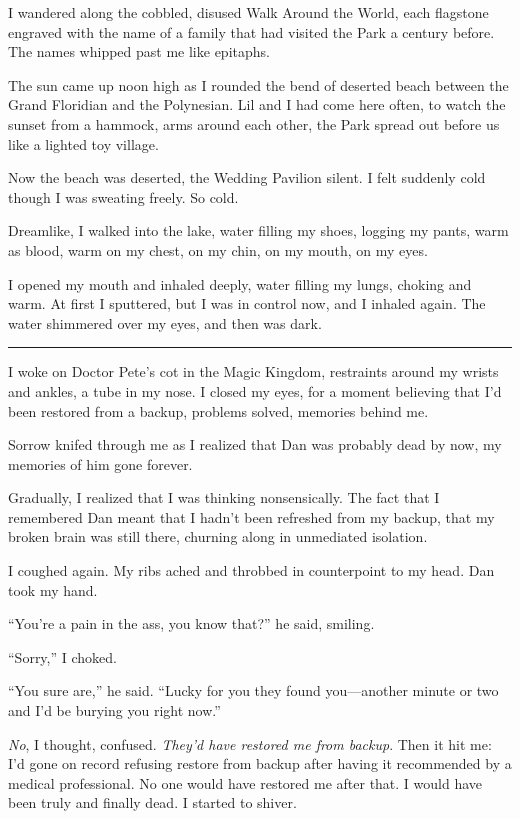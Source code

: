I wandered along the cobbled, disused Walk Around the World, each
flagstone engraved with the name of a family that had visited the
Park a century before. The names whipped past me like epitaphs.

The sun came up noon high as I rounded the bend of deserted beach
between the Grand Floridian and the Polynesian. Lil and I had come
here often, to watch the sunset from a hammock, arms around each
other, the Park spread out before us like a lighted toy village.

Now the beach was deserted, the Wedding Pavilion silent. I felt
suddenly cold though I was sweating freely. So cold.

Dreamlike, I walked into the lake, water filling my shoes, logging
my pants, warm as blood, warm on my chest, on my chin, on my mouth,
on my eyes.

I opened my mouth and inhaled deeply, water filling my lungs,
choking and warm. At first I sputtered, but I was in control now,
and I inhaled again. The water shimmered over my eyes, and then was
dark.

\begin{center}\rule{3in}{0.4pt}\end{center}

I woke on Doctor Pete's cot in the Magic Kingdom, restraints around
my wrists and ankles, a tube in my nose. I closed my eyes, for a
moment believing that I'd been restored from a backup, problems
solved, memories behind me.

Sorrow knifed through me as I realized that Dan was probably dead
by now, my memories of him gone forever.

Gradually, I realized that I was thinking nonsensically. The fact
that I remembered Dan meant that I hadn't been refreshed from my
backup, that my broken brain was still there, churning along in
unmediated isolation.

I coughed again. My ribs ached and throbbed in counterpoint to my
head. Dan took my hand.

“You're a pain in the ass, you know that?” he said, smiling.

“Sorry,” I choked.

“You sure are,” he said. “Lucky for you they found you—another
minute or two and I'd be burying you right now.”

\emph{No}, I thought, confused.
\emph{They'd have restored me from backup}. Then it hit me: I'd
gone on record refusing restore from backup after having it
recommended by a medical professional. No one would have restored
me after that. I would have been truly and finally dead. I started
to shiver.

